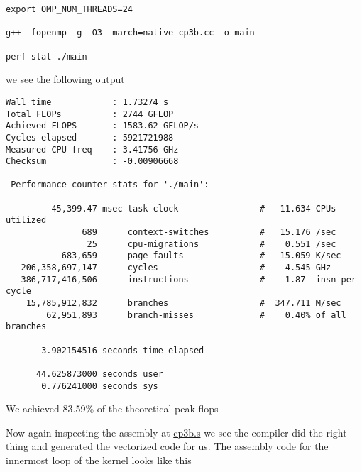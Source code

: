 \begin{verbatim}
export OMP_NUM_THREADS=24

g++ -fopenmp -g -O3 -march=native cp3b.cc -o main

perf stat ./main
\end{verbatim}

we see the following output

\begin{verbatim}
Wall time            : 1.73274 s
Total FLOPs          : 2744 GFLOP
Achieved FLOPS       : 1583.62 GFLOP/s
Cycles elapsed       : 5921721988
Measured CPU freq    : 3.41756 GHz
Checksum             : -0.00906668

 Performance counter stats for './main':

         45,399.47 msec task-clock                #   11.634 CPUs utilized          
               689      context-switches          #   15.176 /sec                   
                25      cpu-migrations            #    0.551 /sec                   
           683,659      page-faults               #   15.059 K/sec                  
   206,358,697,147      cycles                    #    4.545 GHz                    
   386,717,416,506      instructions              #    1.87  insn per cycle         
    15,785,912,832      branches                  #  347.711 M/sec                  
        62,951,893      branch-misses             #    0.40% of all branches        

       3.902154516 seconds time elapsed

      44.625873000 seconds user
       0.776241000 seconds sys
\end{verbatim}

We achieved 83.59\% of the theoretical peak flops

Now again inspecting the assembly at \href{./cp3b.s}{cp3b.s} we see the
compiler did the right thing and generated the vectorized code for us.
The assembly code for the innermost loop of the kernel looks like this

